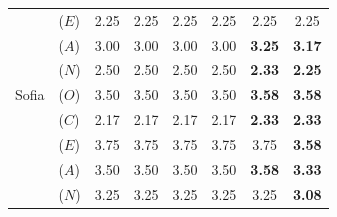 \begin{table}[t]
\begin{tabular}{llcccccc}
 & ($E$) & 2.25 & 2.25 & 2.25 & 2.25 & 2.25 & 2.25 \\
 & ($A$) & 3.00 & 3.00 & 3.00 & 3.00 & \textbf{3.25} & \textbf{3.17} \\
 & ($N$) & 2.50 & 2.50 & 2.50 & 2.50 & \textbf{2.33} & \textbf{2.25} \\
\addlinespace
Sofia & ($O$) & 3.50 & 3.50 & 3.50 & 3.50 & \textbf{3.58} & \textbf{3.58} \\
 & ($C$) & 2.17 & 2.17 & 2.17 & 2.17 & \textbf{2.33} & \textbf{2.33} \\
 & ($E$) & 3.75 & 3.75 & 3.75 & 3.75 & 3.75 & \textbf{3.58} \\
 & ($A$) & 3.50 & 3.50 & 3.50 & 3.50 & \textbf{3.58} & \textbf{3.33} \\
 & ($N$) & 3.25 & 3.25 & 3.25 & 3.25 & 3.25 & \textbf{3.08} \\
\bottomrule
\end{tabular}
\end{table}